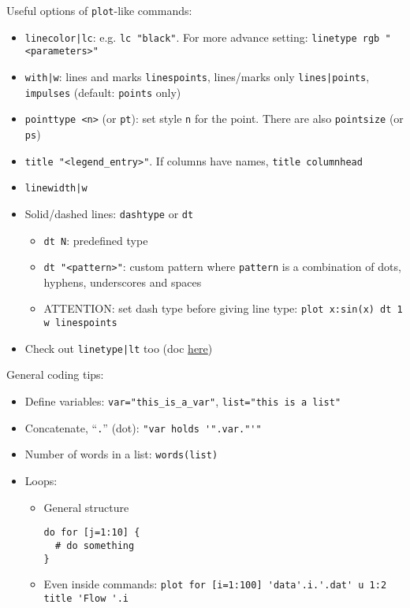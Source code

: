 \documentclass[a4paper,12pt,%
              final%
              ]{article}
\begin{document}
Useful options of \texttt{plot}-like commands:
\begin{itemize}
  \item \verb!linecolor|lc!: e.g. \verb|lc "black"|. For more advance setting: \verb|linetype rgb "<parameters>"|
  \item \verb!with|w!: lines and marks \verb|linespoints|, lines/marks only \verb!lines|points!, \verb|impulses| (default: \verb|points| only)
  \item \verb|pointtype <n>| (or \verb|pt|): set style \texttt{n} for the point. There are also \verb|pointsize| (or \verb|ps|)
  \item \verb|title "<legend_entry>"|. If columns have names, \verb|title columnhead|
  \item \verb!linewidth|w!
  \item Solid/dashed lines: \verb|dashtype| or \verb|dt|
    \begin{itemize}
      \item \verb|dt N|: predefined type
      \item \verb|dt "<pattern>"|: custom pattern where \verb|pattern| is a combination of dots, hyphens, underscores and spaces
      \item ATTENTION: set dash type before giving line type: \verb|plot x:sin(x) dt 1 w linespoints|
    \end{itemize}
  \item Check out \verb!linetype|lt! too (doc \href{http://www.gnuplot.info/docs_4.2/node62.html}{here})
\end{itemize}

General coding tips:
\begin{itemize}
  \item Define variables: \verb|var="this_is_a_var"|, \verb|list="this is a list"|
  \item Concatenate, ``\texttt{.}'' (dot): \verb|"var holds '".var."'"|
  \item Number of words in a list: \verb|words(list)|
  \item Loops:
    \begin{itemize}
      \item General structure
\begin{verbatim}
do for [j=1:10] {
  # do something
}
\end{verbatim}
      \item Even inside commands: \verb|plot for [i=1:100] 'data'.i.'.dat' u 1:2 title 'Flow '.i|
    \end{itemize}
\end{itemize}
\end{document}
